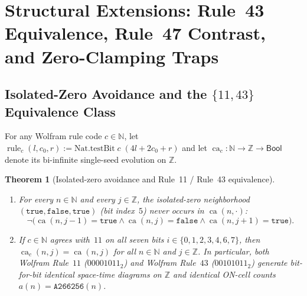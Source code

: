 \documentclass[11pt]{article}
\newtheorem{theorem}{Theorem}[section]
\theoremstyle{definition}
\newcommand{\N}{\mathbb{N}}
\newcommand{\Z}{\mathbb{Z}}
\newcommand{\seq}[1]{\texttt{#1}}
\newcommand{\ca}{\operatorname{ca}}
\begin{document}
\section{Structural Extensions: Rule~43 Equivalence, Rule~47 Contrast, and Zero-Clamping Traps}

\subsection{Isolated-Zero Avoidance and the \texorpdfstring{$\{11, 43\}$}{\{11, 43\}} Equivalence Class}

For any Wolfram rule code $c \in \N$, let $\operatorname{rule}_c(l, c_0, r) := \mathrm{Nat.testBit}\;c\;(4l + 2c_0 + r)$ and let $\ca_c : \N \to \Z \to \mathsf{Bool}$ denote its bi-infinite single-seed evolution on $\Z$.

\begin{theorem}[Isolated-zero avoidance and Rule~11 / Rule~43 equivalence]
\label{thm:rule43}
\begin{enumerate}
\item[\textup{(a)}] For every $n \in \N$ and every $j \in \Z$, the isolated-zero neighborhood $(\mathtt{true}, \mathtt{false}, \mathtt{true})$ (bit index~$5$) never occurs in $\ca(n, \cdot)$:
\[
\neg\bigl(\ca(n, j - 1) = \mathtt{true} \land \ca(n, j) = \mathtt{false} \land \ca(n, j + 1) = \mathtt{true}\bigr).
\]
\item[\textup{(b)}] If $c \in \N$ agrees with~$11$ on all seven bits $i \in \{0, 1, 2, 3, 4, 6, 7\}$, then $\ca_c(n, j) = \ca(n, j)$ for all $n \in \N$ and $j \in \Z$. In particular, both Wolfram Rule~$11$ ($00001011_2$) and Wolfram Rule~$43$ ($00101011_2$) generate bit-for-bit identical space-time diagrams on $\Z$ and identical ON-cell counts $a(n) = \seq{A266256}(n)$.
\end{enumerate}
\end{theorem}
\end{document}
